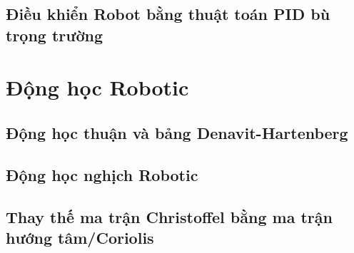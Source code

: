 \subsection{Điều khiển Robot bằng thuật toán PID bù trọng trường}

\section{Động học Robotic}

\subsection{Động học thuận và bảng Denavit-Hartenberg}

\subsection{Động học nghịch Robotic}

\subsection{Thay thế ma trận Christoffel bằng ma trận hướng tâm/Coriolis}

